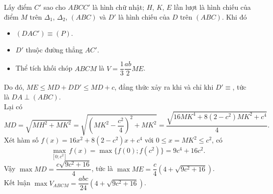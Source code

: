 \begin{ex}
{\begin{center}
		\end{center}
	Lấy điểm $ C' $ sao cho $ ABCC' $ là hình chữ nhật; $ H $, $ K $, $ E $ lần lượt là hình chiếu của điểm $ M $ trên $ \Delta_1 $, $ \Delta_2 $, $ (ABC) $ và $ D' $ là hình chiếu của $ D $ trên $ (ABC) $. Khi đó
	\begin{itemize}
		\item $ (DAC')\equiv (P) $.
		\item $ D' $ thuộc đường thẳng $ AC' $.
		\item Thể tích khối chóp $ ABCM $ là $ V=\dfrac{1}{3}\dfrac{ab}{2}ME $.
	\end{itemize}
	Do đó, $ ME\leq MD+DD'\leq MD+c $, đẳng thức xảy ra khi và chỉ khi $ D'\equiv $, tức là $ DA\perp (ABC) $.\\
	Lại có $$ MD=\sqrt{MH^2+MK^2}=\sqrt{\left(MK^2-\dfrac{c^2}{4}\right)^2+MK^2}=\dfrac{\sqrt{16MK^4+8(2-c^2)MK^2+c^4}}{4} .$$
	Xét hàm số $ f(x)=16x^2+8(2-c^2)x+c^4 $ với $ 0\leq x=MK^2\leq c^2 $, có $$ \max\limits_{[0;c^2]} f(x)=\max\{f(0);f(c^2)\}=9c^4+16c^2.$$
	Vậy $ \max MD=\dfrac{c\sqrt{9c^2+16}}{4} $, tức là $ \max ME=\dfrac{c}{4}\left(4+\sqrt{9c^2+16}\right) $.\\
	Kết luận $ \max V_{ABCM}=\dfrac{abc}{24}\left(4+\sqrt{9c^2+16}\right)$.	
	}
\end{ex}
